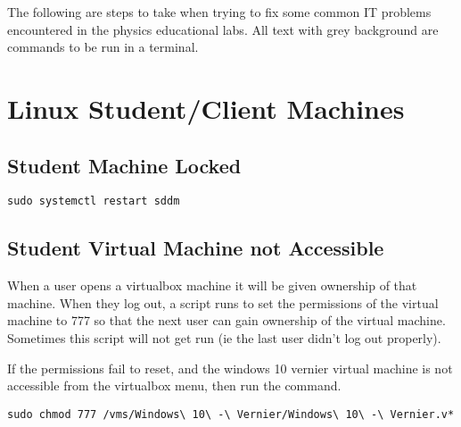 \documentclass{../../../assets/LabArx-Dev} 	%
\begin{document}


\maketitle
\fancyfoot{}

The following are steps to take when trying to fix some common IT problems encountered in the physics educational labs. All text with grey background are commands to be run in a terminal.

\section*{Linux Student/Client Machines} 

\subsection{Student Machine Locked}
\begin{lstlisting}
sudo systemctl restart sddm
\end{lstlisting}

\subsection{Student Virtual Machine not Accessible}
When a user opens a virtualbox machine it will be given ownership of that machine. When they log out, a script runs to set the permissions of the virtual machine to 777 so that the next user can gain ownership of the virtual machine. Sometimes this script will not get run (ie the last user didn't log out properly). 

If the permissions fail to reset, and the windows 10 vernier virtual machine is not accessible from the virtualbox menu, then run the command.\begin{lstlisting}
sudo chmod 777 /vms/Windows\ 10\ -\ Vernier/Windows\ 10\ -\ Vernier.v* 
\end{lstlisting}
\end{document}
